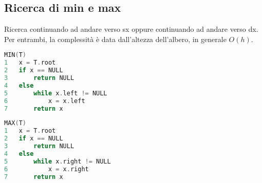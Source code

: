 \subsection{Ricerca di min e max}
Ricerca continuando ad andare verso sx oppure continuando ad andare verso dx. Per entrambi, la complessità è data dall'altezza dell'albero, in generale $O(h)$.
\begin{multicols}{2}
\begin{mdframed}
\begin{lstlisting}[language=C]
MIN(T)
1   x = T.root
2   if x == NULL
3       return NULL
4   else
5       while x.left != NULL
6           x = x.left
7       return x
\end{lstlisting}
\end{mdframed}
\begin{mdframed}
\begin{lstlisting}[language=C]
MAX(T)
1   x = T.root
2   if x == NULL
3       return NULL
4   else
5       while x.right != NULL
6           x = x.right
7       return x
\end{lstlisting}
\end{mdframed}
\end{multicols}
